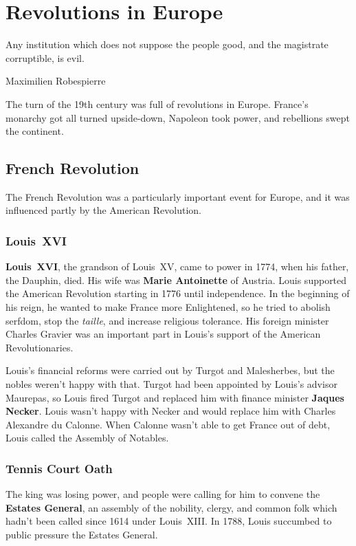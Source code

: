 \chapter{Revolutions in Europe}

\epigraph{%
  Any institution which does not suppose the people good, and the magistrate corruptible, is evil.
}{Maximilien Robespierre}

The turn of the 19th century was full of revolutions in Europe.
France's monarchy got all turned upside-down, Napoleon took power, and rebellions swept the continent.

\section{French Revolution}

The French Revolution was a particularly important event for Europe,
and it was influenced partly by the American Revolution.

\subsection*{Louis~XVI}

\textbf{Louis~XVI}, the grandson of Louis~XV, came to power in 1774, when his father, the Dauphin, died.
His wife was \textbf{Marie Antoinette} of Austria.
Louis supported the American Revolution starting in 1776 until independence.
In the beginning of his reign, he wanted to make France more Enlightened,
so he tried to abolish serfdom, stop the \textit{taille}, and increase religious tolerance.
His foreign minister Charles Gravier was an important part in Louis's support of the American Revolutionaries.

Louis's financial reforms were carried out by Turgot and Malesherbes, but the nobles weren't happy with that.
Turgot had been appointed by Louis's advisor Maurepas,
so Louis fired Turgot and replaced him with finance minister \textbf{Jaques Necker}.
Louis wasn't happy with Necker and would replace him with Charles Alexandre du Calonne.
When Calonne wasn't able to get France out of debt, Louis called the Assembly of Notables.

\subsection*{Tennis Court Oath}

The king was losing power, and people were calling for him to convene the \textbf{Estates General},
an assembly of the nobility, clergy, and common folk which hadn't been called since 1614 under Louis~XIII\@.
In 1788, Louis succumbed to public pressure the Estates General.

